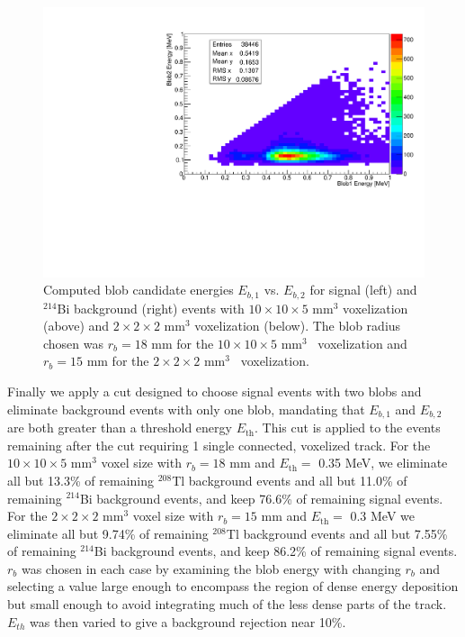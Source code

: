 \documentclass[a4paper,11pt]{article}
\begin{document}
\begin{figure}[!htb]
	\includegraphics[scale = 0.35]{fig/blob1vsblob2_Paolina222_Bi214.pdf}
	\caption{Computed blob candidate energies $E_{b,1}$ vs. $E_{b,2}$ for signal (left) and $^{214}$Bi background (right) events with $10 \times 10 \times 5$ mm$^3$ voxelization (above) and 
		$2 \times 2 \times 2$ mm$^3$ voxelization (below).  The blob radius chosen was $r_b = 18$ mm for the $10 \times 10 \times 5$ mm$^3$~ voxelization and $r_b = 15$ mm for the $2 \times 2 \times 2$ mm$^3$~ voxelization.} \label{fig.blobcuts}
\end{figure}

Finally we apply a cut designed to choose signal events with two blobs and eliminate background events with only one blob, mandating that $E_{b,1}$ and $E_{b,2}$ are both greater than a threshold energy $E_{\mathrm{th}}$.  This cut is applied to the events remaining after the cut requiring 1 single connected, voxelized track.  For the $10 \times 10 \times 5$ mm$^3$ voxel size with $r_b = 18$ mm and $E_{\mathrm{th}} =$ 0.35 MeV, we eliminate all but 13.3\% of remaining $^{208}$Tl background events and all but 11.0\% of remaining $^{214}$Bi background events, and keep 76.6\% of remaining signal events.  For the $2 \times 2 \times 2$ mm$^3$ voxel size with $r_b = 15$ mm and $E_{\mathrm{th}} =$ 0.3 MeV we eliminate all but 9.74\% of remaining $^{208}$Tl background events and all but 7.55\% of remaining $^{214}$Bi background events, and keep 86.2\% of remaining signal events.  $r_{b}$ was chosen in each case by examining the blob energy with changing $r_b$ and selecting a value large enough to encompass the region of dense energy deposition but small enough to avoid integrating much of the less dense parts of the track.  $E_{th}$ was then varied to give a background rejection near 10\%.
\end{document}
